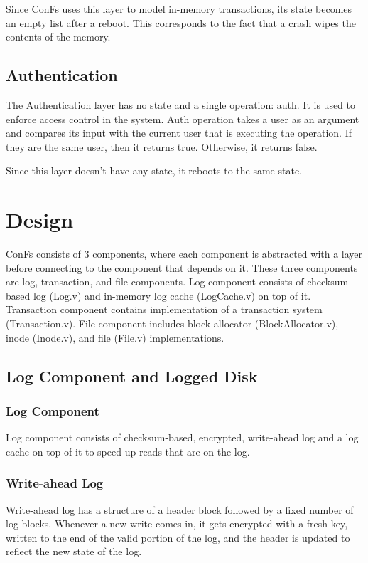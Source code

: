Since ConFs uses this layer to model in-memory transactions, its state becomes an empty list after a reboot. This corresponds to the fact that a crash wipes the contents of the memory.


\subsection{Authentication}
The Authentication layer has no state and a single operation: auth. It is used to enforce access control in the system. Auth operation takes a user as an argument and compares its input with the current user that is executing the operation. If they are the same user, then it returns true. Otherwise, it returns false.

Since this layer doesn't have any state, it reboots to the same state.

\section{Design}
ConFs consists of 3 components, where each component is abstracted with a layer before connecting to the component that depends on it. These three components are log, transaction, and file components. Log component consists of checksum-based log (Log.v) and in-memory log cache (LogCache.v) on top of it. Transaction component contains implementation of a transaction system (Transaction.v). File component includes block allocator (BlockAllocator.v), inode (Inode.v), and file (File.v) implementations.

\subsection{Log Component and Logged Disk}
\subsubsection{Log Component}
Log component consists of checksum-based, encrypted, write-ahead log and a log cache on top of it to speed up reads that are on the log.

\subsubsection*{Write-ahead Log}
Write-ahead log has a structure of a header block followed by a fixed number of log blocks. Whenever a new write comes in, it gets encrypted with a fresh key, written to the end of the valid portion of the log, and the header is updated to reflect the new state of the log.

